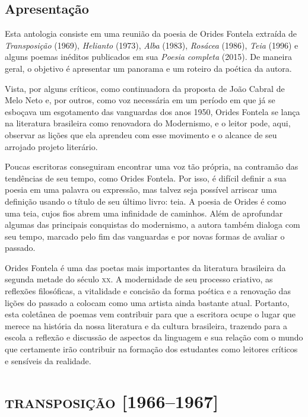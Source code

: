 \chapter{Apresentação}

Esta antologia consiste em uma reunião da poesia de Orides Fontela
extraída de \emph{Transposição} (1969), \emph{Helianto} (1973),
\emph{Alba} (1983), \emph{Rosácea} (1986), \emph{Teia} (1996) e alguns
poemas inéditos publicados em sua \emph{Poesia completa} (2015). De
maneira geral, o objetivo é apresentar um panorama e um roteiro da
poética da autora.

Vista, por alguns críticos, como continuadora da proposta de João Cabral
de Melo Neto e, por outros, como voz necessária em um período em que já
se esboçava um esgotamento das vanguardas dos anos 1950, Orides Fontela
se lança na literatura brasileira como renovadora do Modernismo, e o
leitor pode, aqui, observar as lições que ela aprendeu com esse
movimento e o alcance de seu arrojado projeto literário.

Poucas escritoras conseguiram encontrar uma voz tão própria, na
contramão das tendências de seu tempo, como Orides Fontela. Por isso, é
difícil definir a sua poesia em uma palavra ou expressão, mas talvez
seja possível arriscar uma definição usando o título de seu último
livro: teia. A poesia de Orides é como uma teia, cujos fios abrem uma
infinidade de caminhos. Além de aprofundar algumas das principais
conquistas do modernismo, a autora também dialoga com seu tempo, marcado
pelo fim das vanguardas e por novas formas de avaliar o passado.

Orides Fontela é uma das poetas mais importantes da literatura
brasileira da segunda metade do século \textsc{xx}. A modernidade de seu processo
criativo, as reflexões filosóficas, a vitalidade e concisão da forma
poética e a renovação das lições do passado a colocam como uma artista
ainda bastante atual. Portanto, esta coletânea de poemas vem contribuir
para que a escritora ocupe o lugar que merece na história da nossa
literatura e da cultura brasileira, trazendo para a escola a reflexão e
discussão de aspectos da linguagem e sua relação com o mundo que
certamente irão contribuir na formação dos estudantes como leitores
críticos e sensíveis da realidade.


\part{\textsc{transposição} {[}1966--1967{]}}

